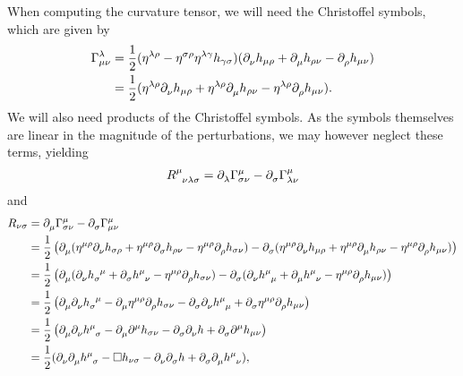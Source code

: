 When computing the curvature tensor, we will need the Christoffel symbols, which are given by
\begin{align*}
	\chris{\lambda}{\mu}{\nu} &= \frac{1}{2}(\eta^{\lambda\rho} - \eta^{\sigma\rho}\eta^{\lambda\gamma}h_{\gamma\sigma})(\del{\nu}{h_{\mu\rho}} + \del{\mu}{h_{\rho\nu}} - \del{\rho}{h_{\mu\nu}}) \\
	                          &= \frac{1}{2}(\eta^{\lambda\rho}\del{\nu}{h_{\mu\rho}} + \eta^{\lambda\rho}\del{\mu}{h_{\rho\nu}} - \eta^{\lambda\rho}\del{\rho}{h_{\mu\nu}}).
\end{align*}
We will also need products of the Christoffel symbols. As the symbols themselves are linear in the magnitude of the perturbations, we may however neglect these terms, yielding
\begin{align*}
	\tensor{R}{^{\mu}_{\nu\lambda\sigma}} = \del{\lambda}{\chris{\mu}{\sigma}{\nu}} - \del{\sigma}{\chris{\mu}{\lambda}{\nu}}
\end{align*}
and
\begin{align*}
	R_{\nu\sigma} &= \del{\mu}{\chris{\mu}{\sigma}{\nu}} - \del{\sigma}{\chris{\mu}{\mu}{\nu}} \\
	              &= \frac{1}{2}\left(\del{\mu}{(\eta^{\mu\rho}\del{\nu}{h_{\sigma\rho}} + \eta^{\mu\rho}\del{\sigma}{h_{\rho\nu}} - \eta^{\mu\rho}\del{\rho}{h_{\sigma\nu}})} - \del{\sigma}{(\eta^{\mu\rho}\del{\nu}{h_{\mu\rho}} + \eta^{\mu\rho}\del{\mu}{h_{\rho\nu}} - \eta^{\mu\rho}\del{\rho}{h_{\mu\nu}})}\right) \\
	              &= \frac{1}{2}\left(\del{\mu}{(\del{\nu}{\tensor{h}{_{\sigma}^{\mu}}} + \del{\sigma}{\tensor{h}{^{\mu}_{\nu}}} - \eta^{\mu\rho}\del{\rho}{h_{\sigma\nu}})} - \del{\sigma}{(\del{\nu}{\tensor{h}{^{\mu}_{\mu}}} + \del{\mu}{\tensor{h}{^{\mu}_{\nu}}} - \eta^{\mu\rho}\del{\rho}{h_{\mu\nu}})}\right) \\
	              &= \frac{1}{2}\left(\del{\mu}{\del{\nu}{\tensor{h}{_{\sigma}^{\mu}}}} - \del{\mu}{\eta^{\mu\rho}\del{\rho}{h_{\sigma\nu}}} - \del{\sigma}{\del{\nu}{\tensor{h}{^{\mu}_{\mu}}}} + \del{\sigma}{\eta^{\mu\rho}\del{\rho}{h_{\mu\nu}}}\right) \\
	              &= \frac{1}{2}\left(\del{\mu}{\del{\nu}{\tensor{h}{^{\mu}_{\sigma}}}} - \del{\mu}{\del[\mu]{}{h_{\sigma\nu}}} - \del{\sigma}{\del{\nu}{h}} + \del{\sigma}{\del[\mu]{}{h_{\mu\nu}}}\right) \\
	              &= \frac{1}{2}(\del{\nu}{\del{\mu}{\tensor{h}{^{\mu}_{\sigma}}}} - \square h_{\nu\sigma} - \del{\nu}{\del{\sigma}{h}} + \del{\sigma}{\del{\mu}{\tensor{h}{^{\mu}_{\nu}}}}),
\end{align*}
